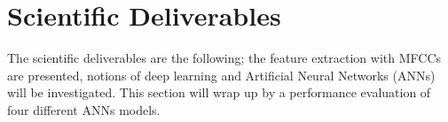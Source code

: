 
\section{Scientific Deliverables}

The scientific deliverables are the following; the feature extraction with MFCCs
are presented, notions of deep learning and Artificial Neural Networks (ANNs)
will be investigated. This section will wrap up by a performance evaluation of
four different ANNs models.

